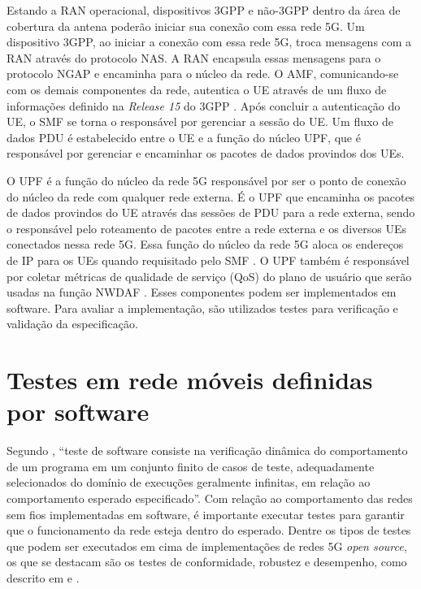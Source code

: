 Estando a RAN operacional, dispositivos 3GPP e não-3GPP dentro da área de cobertura da antena poderão iniciar sua conexão com essa rede 5G. Um dispositivo 3GPP, ao iniciar a conexão com essa rede 5G, troca mensagens com a RAN através do protocolo NAS. A RAN encapsula essas mensagens para o protocolo NGAP e encaminha para o núcleo da rede. O AMF, comunicando-se com os demais componentes da rede, autentica o UE através de um fluxo de informações definido na \textit{Release 15} do 3GPP \cite{3gpp.29.509}. Após concluir a autenticação do UE, o SMF se torna o responsável por gerenciar a sessão do UE. Um fluxo de dados PDU é estabelecido entre o UE e a função do núcleo UPF, que é responsável por gerenciar e encaminhar os pacotes de dados provindos dos UEs.

O UPF é a função do núcleo da rede 5G responsável por ser o ponto de conexão do núcleo da rede com qualquer rede externa.
É o UPF que encaminha os pacotes de dados provindos do UE através das sessões de PDU para a rede externa, sendo o responsável pelo roteamento de pacotes entre a rede externa e os diversos UEs conectados nessa rede 5G.
Essa função do núcleo da rede 5G aloca os endereços de IP para os UEs quando requisitado pelo SMF \cite{3gpp.23.501}.
O UPF também é responsável por coletar métricas de qualidade de serviço (QoS) do plano de usuário que serão usadas na função NWDAF \cite{3gpp.23.548}. 
Esses componentes podem ser implementados em software. Para avaliar a implementação, são utilizados testes para verificação e validação da especificação.

\section{Testes em rede móveis definidas por software}

Segundo \cite[p.~2, tradução nossa]{Bertolino2003}, ``teste de software consiste na verificação dinâmica do comportamento de um programa em um conjunto finito de casos de teste, adequadamente selecionados do domínio de execuções geralmente infinitas, em relação ao comportamento esperado especificado''.
Com relação ao comportamento das redes sem fios implementadas em software, é importante executar testes para garantir que o funcionamento da rede esteja dentro do esperado.
Dentre os tipos de testes que podem ser executados em cima de implementações de redes 5G \textit{open source}, os que se destacam são os testes de conformidade, robustez e desempenho, como descrito em  e .

